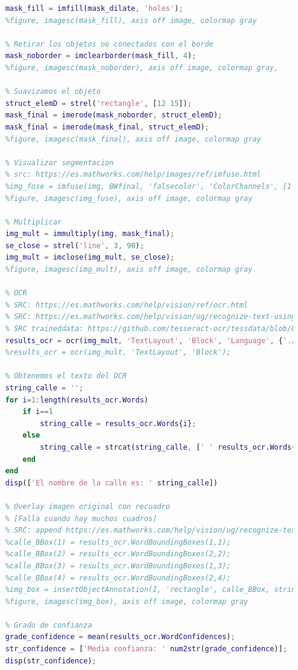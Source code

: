 \documentclass[12pt]{article}
\begin{document}
\begin{lstlisting}[language=matlab, caption={Código implementado para segmentación y OCR de carteles de calles, utilizando morfología matemática}]
	% Llenar brechas interiores
	mask_fill = imfill(mask_dilate, 'holes');
	%figure, imagesc(mask_fill), axis off image, colormap gray

	% Retirar los objetos no conectados con el borde
	mask_noborder = imclearborder(mask_fill, 4);
	%figure, imagesc(mask_noborder), axis off image, colormap gray,

	% Suavizamos el objeto
	struct_elemD = strel('rectangle', [12 15]);
	mask_final = imerode(mask_noborder, struct_elemD);
	mask_final = imerode(mask_final, struct_elemD);
	%figure, imagesc(mask_final), axis off image, colormap gray

	% Visualizar segmentacion
	% src: https://es.mathworks.com/help/images/ref/imfuse.html
	%img_fuse = imfuse(img, BWfinal, 'falsecolor', 'ColorChannels', [1 2 1]);
	%figure, imagesc(img_fuse), axis off image, colormap gray

	% Multiplicar
	img_mult = immultiply(img, mask_final);
	se_close = strel('line', 3, 90);
	img_mult = imclose(img_mult, se_close);
	%figure, imagesc(img_mult), axis off image, colormap gray

	% OCR
	% SRC: https://es.mathworks.com/help/vision/ref/ocr.html
	% SRC: https://es.mathworks.com/help/vision/ug/recognize-text-using-optical-character-recognition-ocr.html
	% SRC traineddata: https://github.com/tesseract-ocr/tessdata/blob/074c37215b01ab8cc47a0e06ff7356383883d775/spa.traineddata
	results_ocr = ocr(img_mult, 'TextLayout', 'Block', 'Language', {'./tessdata/spa_old_2015.traineddata'});
	%results_ocr = ocr(img_mult, 'TextLayout', 'Block');

	% Obtenemos el texto del OCR
	string_calle = '';
	for i=1:length(results_ocr.Words)
		if i==1
			string_calle = results_ocr.Words{i};
		else
			string_calle = strcat(string_calle, [' ' results_ocr.Words{i}]);
		end
	end
	disp(['El nombre de la calle es: ' string_calle])

	% Overlay imagen original con recuadro 
	% [Falla cuando hay muchos cuadros]
	% SRC: append https://es.mathworks.com/help/vision/ug/recognize-text-using-optical-character-recognition-ocr.html
	%calle_BBox(1) = results_ocr.WordBoundingBoxes(1,1);
	%calle_BBox(2) = results_ocr.WordBoundingBoxes(2,2);
	%calle_BBox(3) = results_ocr.WordBoundingBoxes(1,3);
	%calle_BBox(4) = results_ocr.WordBoundingBoxes(2,4);
	%img_box = insertObjectAnnotation(I, 'rectangle', calle_BBox, string_calle);
	%figure, imagesc(img_box), axis off image, colormap gray

	% Grado de confianza
	grade_confidence = mean(results_ocr.WordConfidences);
	str_confidence = ['Media confianza: ' num2str(grade_confidence)];
	disp(str_confidence);


\end{lstlisting}
\end{document}

